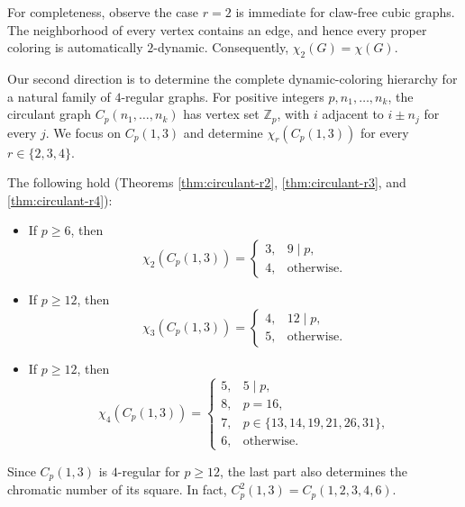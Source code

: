 For completeness, observe the case $r=2$ is immediate for claw-free cubic graphs. The neighborhood of every vertex contains an edge, and hence
every proper coloring is automatically $2$-dynamic. Consequently,
$
\chi_2(G)=\chi(G).
$

Our second direction is to determine the complete dynamic-coloring
hierarchy for a natural family of $4$-regular graphs. For positive
integers $p,n_1,\ldots,n_k$, the circulant graph
$C_p(n_1,\ldots,n_k)$ has vertex set $\mathbb Z_p$, with $i$ adjacent
to $i\pm n_j$ for every $j$. We focus on $C_p(1,3)$ and determine
$\chi_r(C_p(1,3))$ for every $r\in\{2,3,4\}$.

The following hold (Theorems
\ref{thm:circulant-r2},     
\ref{thm:circulant-r3}, and \ref{thm:circulant-r4}):
\begin{itemize}
 \item If $p\ge6$, then
\[
\chi_2(C_p(1,3))=
\begin{cases}
3,&9\mid p,\\
4,&\text{otherwise}.
\end{cases}
\]

\item If $p\ge12$, then
\[
\chi_3(C_p(1,3))=
\begin{cases}
4,&12\mid p,\\
5,&\text{otherwise}.
\end{cases}
\]

\item If $p\ge12$, then
\[
\chi_4(C_p(1,3))=
\begin{cases}
5,&5\mid p,\\
8,&p=16,\\
7,&p\in\{13,14,19,21,26,31\},\\
6,&\text{otherwise}.
\end{cases}
\]
\end{itemize}

Since $C_p(1,3)$ is $4$-regular for $p\ge12$, the last part also
determines the chromatic number of its square. In fact,
$
C^2_p(1,3)=C_p(1,2,3,4,6).
$

